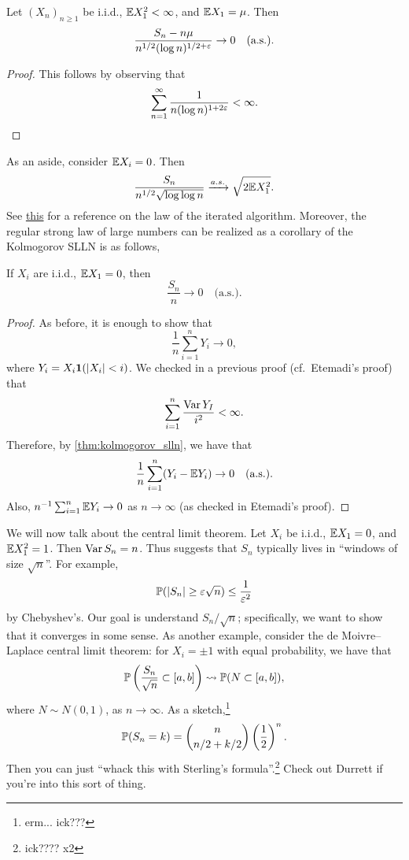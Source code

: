 \begin{corollary} \label{cor:asymptotic_bound_of_S_n}
    Let $(X_n)_{n \geq 1}$ be i.i.d., $\mathbb E X_1^2 < \infty$, and $\mathbb E X_1 = \mu$. Then
    \[ \frac{S_n - n \mu}{n^{1/2} (\log n)^{1/2 + \varepsilon}} \to 0 \quad \text{(a.s.)}. \]
\end{corollary} \vspace{-8pt}
\begin{proof}
    This follows by observing that
    \[ \sum_{n=1}^\infty \frac{1}{n (\log n)^{1 + 2\varepsilon}} < \infty. \qedhere \]
\end{proof} \vspace{-3pt}
As an aside, consider $\mathbb E X_i = 0$. Then
\[ \frac{S_n}{n^{1/2} \sqrt{\log \log n}} \xrightarrow{a.s.} \sqrt{2 \mathbb E X_1^2}. \]
See \href{https://en.wikipedia.org/wiki/Law_of_the_iterated_logarithm}{this} for a reference on the law of the iterated algorithm. Moreover, the regular strong law of large numbers can be realized as a corollary of the Kolmogorov SLLN is as follows,
\begin{corollary} \label{cor:kolmogorov_lln_shortcut}
    If $X_i$ are i.i.d., $\mathbb E X_1 = 0$, then
    \[ \frac{S_n}{n} \to 0 \quad \text{(a.s.)}. \]
\end{corollary} \vspace{-8pt}
\begin{proof}
    As before, it is enough to show that
    \[ \frac{1}{n} \sum_{i=1}^n Y_i \to 0, \]
    where $Y_i = X_i \mathbf 1(\left\lvert X_i \right\rvert < i)$. We checked in a previous proof (cf.\ Etemadi's proof) that
    \[ \sum_{i=1}^n \frac{\operatorname{Var} Y_I}{i^2} < \infty. \]
    Therefore, by \ref{thm:kolmogorov_slln}, we have that
    \[ \frac{1}{n} \sum_{i=1}^n (Y_i - \mathbb E Y_i) \to 0 \quad \text{(a.s.)}. \]
    Also, $n^{-1} \sum_{i=1}^n \mathbb E Y_i \to 0$ as $n \to \infty$ (as checked in Etemadi's proof).
\end{proof}

\newpage
We will now talk about the central limit theorem. Let $X_i$ be i.i.d., $\mathbb E X_1 = 0$, and $\mathbb E X_1^2 = 1$. Then $\operatorname{Var} S_n = n$. Thus suggests that $S_n$ typically lives in ``windows of size $\sqrt{n}$''. For example,
\[ \mathbb P(\left\lvert S_n \right\rvert \geq \varepsilon \sqrt{n}) \leq \frac{1}{\varepsilon^2} \]
by Chebyshev's. Our goal is understand $S_n / \sqrt{n}$; specifically, we want to show that it converges in some sense. As another example, consider the de Moivre--Laplace central limit theorem: for $X_i = \pm 1$ with equal probability, we have that
\[ \mathbb P \left(\frac{S_n}{\sqrt{n}} \subset [a, b]\right) \leadsto \mathbb P(N \subset [a, b]), \]
where $N \sim N(0, 1)$, as $n \to \infty$. As a sketch,\footnote{erm... ick???}
\[ \mathbb P(S_n = k) = \binom{n}{n/2 + k/2} \left(\frac{1}{2}\right)^n. \]
Then you can just ``whack this with Sterling's formula''.\footnote{ick???? x2} Check out Durrett if you're into this sort of thing.

